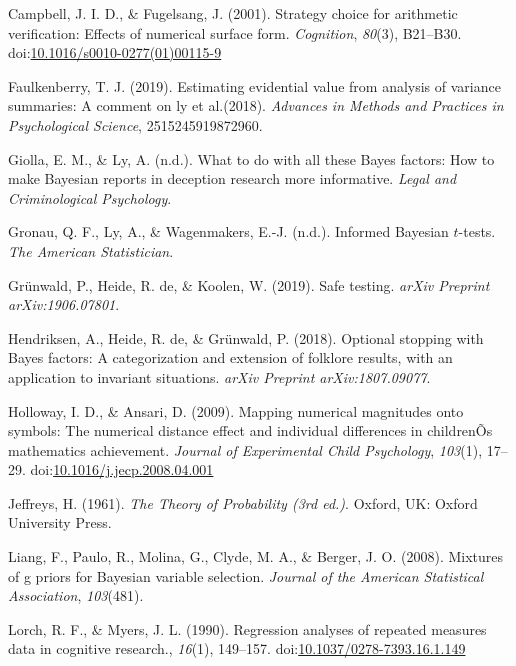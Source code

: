 \documentclass[english,,doc,floatsintext]{apa6}
\begin{document}
\leavevmode\hypertarget{ref-campbellFugelsang2001}{}%
Campbell, J. I. D., \& Fugelsang, J. (2001). Strategy choice for arithmetic verification: Effects of numerical surface form. \emph{Cognition}, \emph{80}(3), B21--B30. doi:\href{https://doi.org/10.1016/s0010-0277(01)00115-9}{10.1016/s0010-0277(01)00115-9}

\leavevmode\hypertarget{ref-faulkenberry2019estimating}{}%
Faulkenberry, T. J. (2019). Estimating evidential value from analysis of variance summaries: A comment on ly et al.(2018). \emph{Advances in Methods and Practices in Psychological Science}, 2515245919872960.

\leavevmode\hypertarget{ref-giollaInpresswhat}{}%
Giolla, E. M., \& Ly, A. (n.d.). What to do with all these Bayes factors: How to make Bayesian reports in deception research more informative. \emph{Legal and Criminological Psychology}.

\leavevmode\hypertarget{ref-gronauInpressinformed}{}%
Gronau, Q. F., Ly, A., \& Wagenmakers, E.-J. (n.d.). Informed Bayesian \(t\)-tests. \emph{The American Statistician}.

\leavevmode\hypertarget{ref-grunwald2019safe}{}%
Grünwald, P., Heide, R. de, \& Koolen, W. (2019). Safe testing. \emph{arXiv Preprint arXiv:1906.07801}.

\leavevmode\hypertarget{ref-hendriksen2018optional}{}%
Hendriksen, A., Heide, R. de, \& Grünwald, P. (2018). Optional stopping with Bayes factors: A categorization and extension of folklore results, with an application to invariant situations. \emph{arXiv Preprint arXiv:1807.09077}.

\leavevmode\hypertarget{ref-hollowayAnsari2009}{}%
Holloway, I. D., \& Ansari, D. (2009). Mapping numerical magnitudes onto symbols: The numerical distance effect and individual differences in childrenÕs mathematics achievement. \emph{Journal of Experimental Child Psychology}, \emph{103}(1), 17--29. doi:\href{https://doi.org/10.1016/j.jecp.2008.04.001}{10.1016/j.jecp.2008.04.001}

\leavevmode\hypertarget{ref-jeffreys1961}{}%
Jeffreys, H. (1961). \emph{The Theory of Probability (3rd ed.)}. Oxford, UK: Oxford University Press.

\leavevmode\hypertarget{ref-liang2008mixtures}{}%
Liang, F., Paulo, R., Molina, G., Clyde, M. A., \& Berger, J. O. (2008). Mixtures of g priors for Bayesian variable selection. \emph{Journal of the American Statistical Association}, \emph{103}(481).

\leavevmode\hypertarget{ref-lorch1990}{}%
Lorch, R. F., \& Myers, J. L. (1990). Regression analyses of repeated measures data in cognitive research., \emph{16}(1), 149--157. doi:\href{https://doi.org/10.1037/0278-7393.16.1.149}{10.1037/0278-7393.16.1.149}
\end{document}
